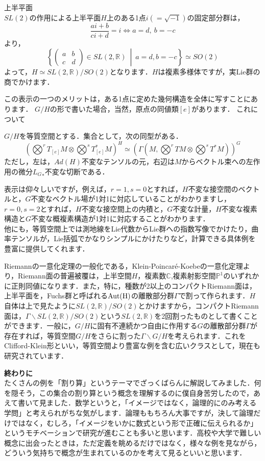 \begin{ex}上半平面\\
$SL(2)$の作用による上半平面$H$上のある1点$i(=\sqrt{-1})$の固定部分群は，
 \[
  \frac{ai+b}{ci+d}=i\Leftrightarrow a=d,\ b=-c
 \]
より，
 \[
  \left\{\left(\begin{matrix}
   a&b\\c&d
  \end{matrix}\right)\in SL(2,\mathbb{R})\ \middle|\  a=d,b=-c\right\}\simeq SO(2)
 \]
よって，$H\simeq SL(2,\mathbb{R})/SO(2)$となります．$H$は複素多様体ですが，実Lie群の商でかけます．
\end{ex}

この表示の一つのメリットは，ある1点に定めた幾何構造を全体に写すことにあります．
$G/H$の形で書いた場合，当然，原点の同値類$[e]$があります．
これについて
\begin{lem}\label{l4}
  $G/H$を等質空間とする．集合として，次の同型がある．
 \[
  (\bigotimes^rT_{[e]}M\otimes\bigotimes^sT^*_{[e]}M)^H\simeq (\Gamma(M,\bigotimes^rTM\otimes\bigotimes^sT^*M))^G
 \]
 ただし，左は，$Ad(H)$不変なテンソルの元，右辺は$M$からベクトル束への左作用の微分${L_{G}}_*$不変な切断である．
 \end{lem}
表示は仰々しいですが，例えば，$r=1,s=0$とすれば，$H$不変な接空間のベクトルと，$G$不変なベクトル場が1対1に対応していることがわかりますし，$r=0,s=2$とすれば，$H$不変な接空間上の内積と，$G$不変な計量，$H$不変な複素構造と$G$不変な概複素構造が1対1に対応することがわかります．\\
他にも，等質空間上では測地線をLie代数からLie群への指数写像でかけたり，曲率テンソルが，Lie括弧でかなりシンプルにかけたりなど，計算できる具体例を豊富に提供してくれます．


Riemannの一意化定理の一般化である，Klein-Poincar\'e-Koebeの一意化定理より，Riemann面の普遍被覆は，上半空間$H$，複素数$\mathbb{C}$,複素射影空間$\mathbb{P}^1$のいずれかに正則同値になります．また，特に，種数が2以上のコンパクトRiemann面は，上半平面を，Fuchs群と呼ばれる$\rm{Aut}(H)$の離散部分群$\Gamma$で割って作られます．$H$自体は上で見たように$SL(2,\mathbb{R})/SO(2)$とかけますから，コンパクトRiemann面は，$\Gamma\backslash SL(2,\mathbb{R})/SO(2)$という$SL(2,\mathbb{R})$を2回割ったものとして書くことができます．一般に，$G/H$に固有不連続かつ自由に作用する$G$の離散部分群$\Gamma$が存在すれば，等質空間$G/H$をさらに割った$\Gamma\backslash G/H$を考えられます．これをClifford-Klein形といい，等質空間より豊富な例を含む広いクラスとして，現在も研究されています．

{\bf 終わりに}\\
たくさんの例を「割り算」というテーマでざっくばらんに解説してみました．何を隠そう，この集合の割り算という概念を理解するのに僕自身苦労したので，あえて書いて見ました．数学というと，「イメージではなく，論理的にのみ考える学問」と考えられがちな気がします．論理ももちろん大事ですが，決して論理だけではなく，むしろ，「イメージをいかに数式という形で正確に伝えられるか」というモチベーションで研究が進むことも多いと思います．高校や大学で難しい概念に出会ったときは，ただ定義を眺めるだけではなく，様々な例を見ながら，どういう気持ちで概念が生まれているのかを考えて見るといいと思います．

